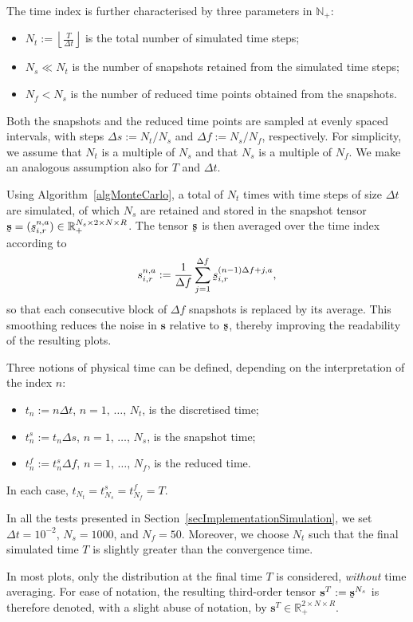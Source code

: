 \documentclass[a4paper]{article}
\newcommand{\N}{\mathbb{N}}
\newcommand{\R}{\mathbb{R}}
\begin{document}
The time index is further characterised by three parameters in $\N_+$:
\begin{itemize}
\item $N_t:=\left\lfloor\frac{T}{\Delta t}\right\rfloor$ is the total number of simulated time steps;
\item $N_s\ll N_t$ is the number of snapshots retained from the simulated time steps;
\item $N_f<N_s$ is the number of reduced time points obtained from the snapshots.
\end{itemize}

Both the snapshots and the reduced time points are sampled at evenly spaced intervals, with steps $\Delta s:=N_t/N_s$ and $\Delta f:=N_s/N_f$, respectively. For simplicity, we assume that $N_t$ is a multiple of $N_s$ and that $N_s$ is a multiple of $N_f$. We make an analogous assumption also for $T$ and $\Delta t$.

Using Algorithm~\ref{algMonteCarlo}, a total of $N_t$ times with time steps of size $\Delta t$ are simulated, of which $N_s$ are retained and stored in the snapshot tensor $\undertilde{\mathbf s}=(\undertilde s^{n,a}_{i,r})\in\R_+^{N_s\times 2\times N\times R}$. The tensor $\undertilde{\mathbf s}$ is then averaged over the time index according to
$$ s^{n,a}_{i,r}:=\frac{1}{\Delta f}\sum_{j=1}^{\Delta f}\undertilde s^{(n-1)\Delta f+j,a}_{i,r}, $$
so that each consecutive block of $\Delta f$ snapshots is replaced by its average. This smoothing reduces the noise in $\mathbf s$ relative to $\undertilde{\mathbf s}$, thereby improving the readability of the resulting plots.

Three notions of physical time can be defined, depending on the interpretation of the index $n$:
\begin{itemize}
\item $t_n:=n\Delta{t}$, $n=1,\,\dots,\,N_t$, is the discretised time;
\item $t^s_n:=t_n\Delta{s}$, $n=1,\,\dots,\,N_s$, is the snapshot time;
\item $t^f_n:=t^s_n\Delta{f}$, $n=1,\,\dots,\,N_f$, is the reduced time.
\end{itemize}
In each case, $t_{N_t}=t^s_{N_s}=t^f_{N_f}=T$.

In all the tests presented in Section~\ref{secImplementationSimulation}, we set $\Delta t=10^{-2}$, $N_s=1000$, and $N_f=50$. Moreover, we choose $N_t$ such that the final simulated time $T$ is slightly greater than the convergence time.

In most plots, only the distribution at the final time $T$ is considered, \textit{without} time averaging. For ease of notation, the resulting third-order tensor $\mathbf s^T:=\undertilde{\mathbf s}^{N_s}$ is therefore denoted, with a slight abuse of notation, by $\mathbf s^T\in\R_+^{2\times N\times R}$.
        
\end{document}
